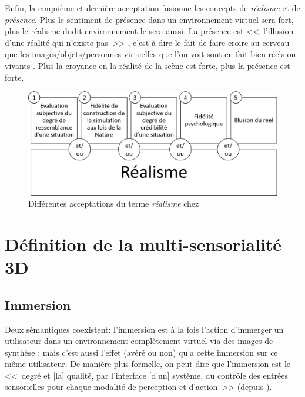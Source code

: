 	\par Enfin, la cinquième et dernière acceptation fusionne les concepts de \textit{réalisme} et de \textit{présence}. Plus le sentiment de présence dans un environnement virtuel sera fort, plus le réalisme dudit environnement le sera aussi. La présence est <<~l'illusion d'une réalité qui n'existe pas~>> \citep{stoffregen_one_2003}, c'est à dire le fait de faire croire au cerveau que les images/objets/personnes virtuelles que l'on voit sont en fait bien réels ou vivants \citep{burkhardt_realite_2003}. Plus la croyance en la réalité de la scène est forte, plus la présence est forte.
	
	\begin{figure}
		\centering
		\includegraphics[scale=.65]{Figures/AcceptationsRealisme}
		\caption{Différentes acceptations du terme \textit{réalisme} chez \citep{fuchs_traite_2003}}
		\label{fig:acceptations_realisme}
	\end{figure}
	
	\section{Définition de la multi-sensorialité 3D}
	\subsection{Immersion}
	\par Deux sémantiques coexistent: l'immersion est à la fois l'action d'immerger un utilisateur dans un environnement complètement virtuel via des images de synthèse ; mais c'est aussi l'effet (avéré ou non) qu'a cette immersion sur ce même utilisateur. De manière plus formelle, on peut dire que l'immersion est le <<~degré et [la] qualité, par l'interface [d'un] système, du contrôle des entrées sensorielles pour chaque modalité de perception et d'action~>> (depuis \citep{fuchs_traite_2003}).
	
